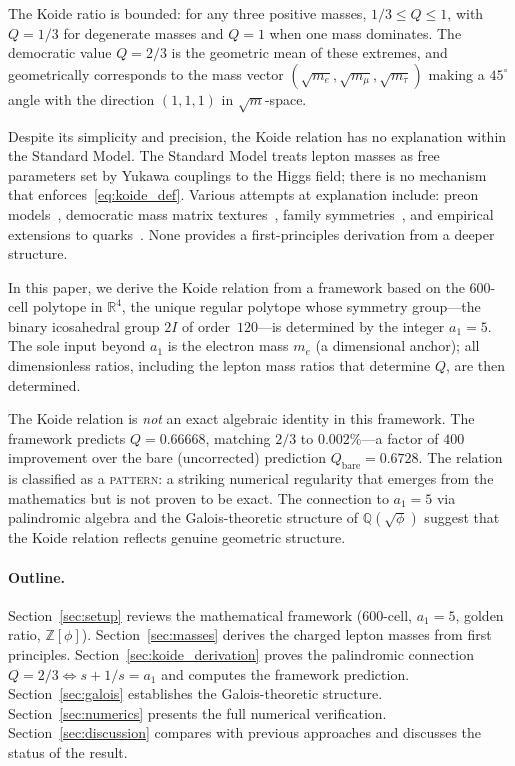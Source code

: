 \documentclass[12pt,a4paper]{article}
\theoremstyle{definition}
\begin{document}
The Koide ratio is bounded: for any three positive masses, $1/3 \leq Q \leq 1$, with $Q = 1/3$ for degenerate masses and $Q = 1$ when one mass dominates.  The democratic value $Q = 2/3$ is the geometric mean of these extremes, and geometrically corresponds to the mass vector $(\sqrt{m_e}, \sqrt{m_\mu}, \sqrt{m_\tau})$ making a $45^\circ$ angle with the direction $(1,1,1)$ in $\sqrt{m}$-space.

Despite its simplicity and precision, the Koide relation has no explanation within the Standard Model.  The Standard Model treats lepton masses as free parameters set by Yukawa couplings to the Higgs field; there is no mechanism that enforces~\eqref{eq:koide_def}.  Various attempts at explanation include: preon models~\cite{Koide1983}, democratic mass matrix textures~\cite{Xing2006}, family symmetries~\cite{Foot1994,Rivero2005}, and empirical extensions to quarks~\cite{Brannen2006}.  None provides a first-principles derivation from a deeper structure.

In this paper, we derive the Koide relation from a framework based on the 600-cell polytope in $\mathbb{R}^4$, the unique regular polytope whose symmetry group---the binary icosahedral group $2I$ of order~$120$---is determined by the integer $a_1 = 5$.  The sole input beyond $a_1$ is the electron mass $m_e$ (a dimensional anchor); all dimensionless ratios, including the lepton mass ratios that determine $Q$, are then determined.

The Koide relation is \emph{not} an exact algebraic identity in this framework.  The framework predicts $Q = 0.66668$, matching $2/3$ to $0.002\%$---a factor of $400$ improvement over the bare (uncorrected) prediction $Q_{\mathrm{bare}} = 0.6728$.  The relation is classified as a \textsc{pattern}: a striking numerical regularity that emerges from the mathematics but is not proven to be exact.  The connection to $a_1 = 5$ via palindromic algebra and the Galois-theoretic structure of $\mathbb{Q}(\sqrt{\phi})$ suggest that the Koide relation reflects genuine geometric structure.

\paragraph{Outline.}  Section~\ref{sec:setup} reviews the mathematical framework (600-cell, $a_1 = 5$, golden ratio, $\mathbb{Z}[\phi]$).  Section~\ref{sec:masses} derives the charged lepton masses from first principles.  Section~\ref{sec:koide_derivation} proves the palindromic connection $Q = 2/3 \Leftrightarrow s + 1/s = a_1$ and computes the framework prediction.  Section~\ref{sec:galois} establishes the Galois-theoretic structure.  Section~\ref{sec:numerics} presents the full numerical verification.  Section~\ref{sec:discussion} compares with previous approaches and discusses the status of the result.
\end{document}
